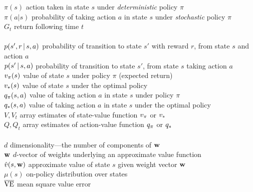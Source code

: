 \documentclass[a4paper, 12pt]{article}
\begin{document}
\begin{tabbing}
    \>$\pi(s)$            \> action taken in state $s$ under {\it deterministic\/} policy $\pi$\\
    \>$\pi(a|s)$          \> probability of taking action $a$ in state $s$ under {\it stochastic\/} policy $\pi$\\
    \>$G_t$               \> return following time $t$\\
    \\
    \>$\p(s',r|s,a)$      \> probability of transition to state $s'$ with reward $r$, from state $s$ and\\
    \>                    \> action $a$\\
    \>$\p(s'|s,a)$        \> probability of transition to state $s'$, from state $s$ taking action $a$\\
    \>$v_\pi(s)$           \> value of state $s$ under policy $\pi$ (expected return)\\
    \>$v_*(s)$         \> value of state $s$ under the optimal policy\\
    \>$q_\pi(s,a)$         \> value of taking action $a$ in state $s$ under policy $\pi$\\
    \>$q_*(s,a)$       \> value of taking action $a$ in state $s$ under the optimal policy\\
    \>$V, V_t$            \> array estimates of state-value function $v_\pi$ or $v_*$\\
    \>$Q, Q_t$            \> array estimates of action-value function $q_\pi$ or $q_*$\\
    \\
    \>$d$                 \> dimensionality---the number of components of ${\bf w}$\\
    \>${\bf w}$                \> $d$-vector of weights underlying an approximate value function\\
    \>$\hat v(s,{\bf w})$      \> approximate value of state $s$ given weight vector ${\bf w}$\\
    \>$\mu(s)$            \> on-policy distribution over states\\
    \>$\overline{\text{VE}}$            \> mean square value error\\
\end{tabbing}
\clearpage

\end{document}
